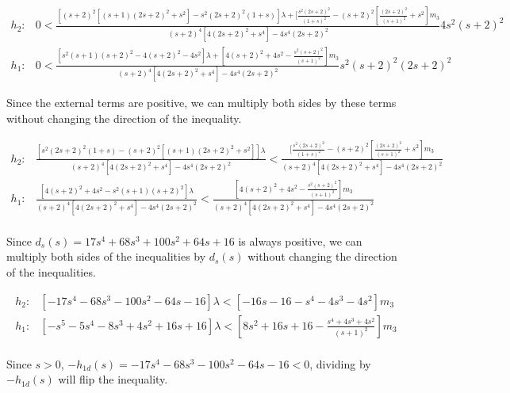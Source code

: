\documentclass[11pt,leqno]{article}
\theoremstyle{definition}
\theoremstyle{remark}
\numberwithin{equation}{section}
\begin{document}
\begin{equation} \begin{array}{ll}
h_2: & 0<\frac{[(s+2)^{2}[(s+1)(2s+2)^{2}+s^{2}]-s^{2}(2s+2)^{2}(1+s)]\lambda+[\frac{s^{2}(2s+2)^{2}}{(1+s)^{2}}-(s+2)^{2}[\frac{(2s+2)^{2}}{(s+1)^{2}}+s^{2}]m_{3}}{(s+2)^{4}[4(2s+2)^{2}+s^{4}]-4s^{4}(2s+2)^{2}}4s^{2}(s+2)^{2}\\

h_1: & 0<\frac{[s^{2}(s+1)(s+2)^{2}-4(s+2)^{2}-4s^{2}]\lambda+[4(s+2)^{2}+4s^{2}-\frac{s^{2}(s+2)^{2}}{(s+1)^{2}}]m_{3}}{(s+2)^{4}[4(2s+2)^{2}+s^{4}]-4s^{4}(2s+2)^{2}}s^{2}(s+2)^{2}(2s+2)^{2}
\end{array}
\end{equation}

Since the external terms are positive, we can multiply both sides by these terms without changing the direction of the inequality.

\begin{equation}
\begin{array}{ll}
h_{2}: & \frac{[s^{2}(2s+2)^{2}(1+s)-(s+2)^{2}[(s+1)(2s+2)^{2}+s^{2}]]\lambda}{(s+2)^{4}[4(2s+2)^{2}+s^{4}]-4s^{4}(2s+2)^{2}}<\frac{[\frac{s^{2}(2s+2)^{2}}{(1+s)^{2}}-(s+2)^{2}[\frac{(2s+2)^{2}}{(s+1)^{2}}+s^{2}]m_{3}}{(s+2)^{4}[4(2s+2)^{2}+s^{4}]-4s^{4}(2s+2)^{2}}\\

h_{1}: & \frac{[4(s+2)^{2}+4s^{2}-s^{2}(s+1)(s+2)^{2}]\lambda}{(s+2)^{4}[4(2s+2)^{2}+s^{4}]-4s^{4}(2s+2)^{2}}<\frac{[4(s+2)^{2}+4s^{2}-\frac{s^{2}(s+2)^{2}}{(s+1)^{2}}]m_{3}}{(s+2)^{4}[4(2s+2)^{2}+s^{4}]-4s^{4}(2s+2)^{2}} \\
\end{array}
\end{equation}

Since $d_s(s) = 17s^{4}+68s^{3}+100s^{2}+64s+16$ is always positive, we can multiply both sides of the inequalities by $d_s(s)$ without
changing the direction of the inequalities.

\begin{equation} \begin{array}{ll}
h_{2}: & [-17s^{4}-68s^{3}-100s^{2}-64s-16]\lambda<[-16s-16-s^{4}-4s^{3}-4s^{2}]m_{3} \\
h_{1}: & [-s^{5}-5s^{4}-8s^{3}+4s^{2}+16s+16]\lambda<[8s^{2}+16s+16-\frac{s^{4}+4s^{3}+4s^{2}}{(s+1)^{2}}]m_{3} \\
\end{array}
\end{equation}

Since $s>0$, $-h_{1d}(s)=-17s^{4}-68s^{3}-100s^{2}-64s-16<0$, dividing by $-h_{1d}(s)$ will flip the inequality.
\end{document}
